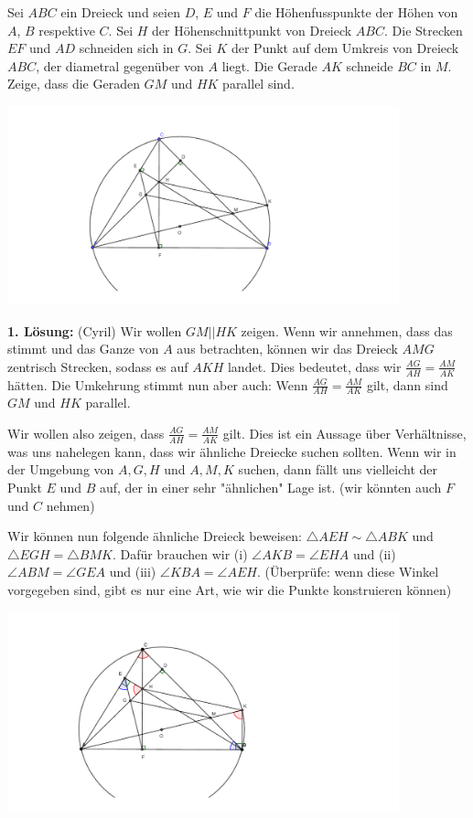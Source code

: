 Sei $ABC$ ein Dreieck und seien $D$, $E$ und $F$ die Höhenfusspunkte der Höhen von $A$, $B$ respektive $C$. Sei $H$ der Höhenschnittpunkt von Dreieck $ABC$. Die Strecken $EF$ und $AD$ schneiden sich in $G$. Sei $K$ der Punkt auf dem Umkreis von Dreieck $ABC$, der diametral gegenüber von $A$ liegt. Die Gerade $AK$ schneide $BC$ in $M$. Zeige, dass die Geraden $GM$ und $HK$ parallel sind.

\begin{center}
\includegraphics[width=0.85\textwidth,trim=80 60 120 30,  clip]{solutions/s1_picture1.pdf}
\end{center}

\textbf{1. Lösung:} (Cyril)
Wir wollen $GM || HK$ zeigen. Wenn wir annehmen, dass das stimmt und das Ganze von $A$ aus betrachten, können wir das Dreieck $AMG$ zentrisch Strecken, sodass es auf $AKH$ landet. Dies bedeutet, dass wir $\frac{AG}{AH} = \frac{AM}{AK}$ hätten. Die Umkehrung stimmt nun aber auch: Wenn $\frac{AG}{AH} = \frac{AM}{AK}$ gilt, dann sind $GM$ und $HK$ parallel.

Wir wollen also zeigen, dass $\frac{AG}{AH} = \frac{AM}{AK}$ gilt. Dies ist ein Aussage über Verhältnisse, was uns nahelegen kann, dass wir ähnliche Dreiecke suchen sollten. Wenn wir in der Umgebung von $A,G,H$ und $A,M,K$ suchen, dann fällt uns vielleicht der Punkt $E$ und $B$ auf, der in einer sehr "ähnlichen" Lage ist. (wir könnten auch $F$ und $C$ nehmen)

Wir können nun folgende ähnliche Dreieck beweisen: $\triangle AEH \sim \triangle ABK$ und $\triangle EGH = \triangle BMK$. Dafür brauchen wir (i) $\angle AKB = \angle EHA$ und (ii) $\angle ABM = \angle GEA$ und (iii) $\angle KBA = \angle AEH$. (Überprüfe: wenn diese Winkel vorgegeben sind, gibt es nur eine Art, wie wir die Punkte konstruieren können)

\begin{center}
\includegraphics[width=0.85\textwidth,trim=80 60 200 30, clip]{solutions/s1_picture2.pdf}
\end{center}

